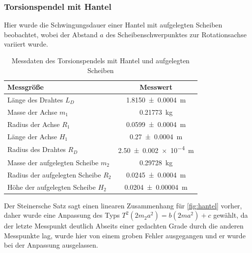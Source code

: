 









\newpage
\subsubsection*{Torsionspendel mit Hantel}
Hier wurde die Schwingungsdauer einer Hantel mit aufgelegten Scheiben beobachtet, wobei der Abstand $a$ des Scheibenschwerpunktes zur Rotationsachse variiert wurde. 



\begin{table}[h]
	\centering	
	\caption{Messdaten des Torsionspendels mit Hantel und aufgelegten Scheiben  }
	\begin{tabular}{|l|c|} 
		\hline 
		Messgröße	& Messwert  \\ 
		\hline 
		Länge des Drahtes $L_D$& \SI{1.8150\pm 0.0004 } {m} \\ 
		\hline 
		Masse der Achse $m_1$& \SI{0.21773}{kg} \\ 
		\hline 
		Radius der Achse $R_1$ & \SI{0.0599 \pm 0.0004}{m}  \\ 
		\hline 
		Länge der Achse $H_1$ &	\SI{0.27\pm 0.0004}	{\metre}	\\
		\hline
		Radius des Drahtes $R_D$ & \SI{2.50+-0.002 e-4} {m} \\ 
		\hline 
		Masse der aufgelegten Scheibe $m_2$& \SI{0.29728}{kg} \\ 
		\hline 
		Radius der aufgelegten Scheibe $R_2$ & \SI{0.0245 \pm 0.0004}{m}  \\ 
		\hline 
		Höhe der aufgelegten Scheibe $H_2$ &\SI{0.0204\pm0.00004 }{\metre}			\\
		\hline
	
	\end{tabular} 
	
	\label{tab:dataTH}
\end{table} 

Der Steinersche Satz sagt einen linearen Zusammenhang für \cref{fig:hantel} vorher, daher wurde eine Anpassung des Typs $T^2(2m_2 a^2)=b (2m a^2)+c$ gewählt, da der letzte Messpunkt deutlich Abseits einer gedachten Grade durch die anderen Messpunkte lag, wurde hier von einem groben Fehler ausgegangen und er wurde bei der Anpassung ausgelassen.


